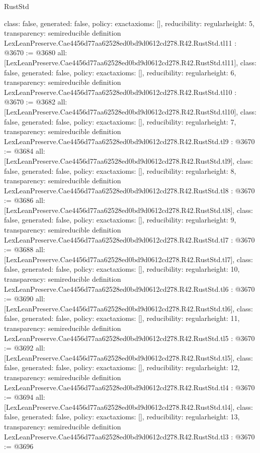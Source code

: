 \begin{lexlean}{RustStd}
\begin{coremodule}
{  class: false,
  generated: false,
  policy: exact{axioms: []},
  reducibility: regular{height: 5},
  transparency: semireducible
}
definition LexLeanPreserve.Cae4456d77aa62528ed0bd9d0612cd278.R42.RustStd.tl11 : @3670 := @3680 {
  all: [LexLeanPreserve.Cae4456d77aa62528ed0bd9d0612cd278.R42.RustStd.tl11],
  class: false,
  generated: false,
  policy: exact{axioms: []},
  reducibility: regular{height: 6},
  transparency: semireducible
}
definition LexLeanPreserve.Cae4456d77aa62528ed0bd9d0612cd278.R42.RustStd.tl10 : @3670 := @3682 {
  all: [LexLeanPreserve.Cae4456d77aa62528ed0bd9d0612cd278.R42.RustStd.tl10],
  class: false,
  generated: false,
  policy: exact{axioms: []},
  reducibility: regular{height: 7},
  transparency: semireducible
}
definition LexLeanPreserve.Cae4456d77aa62528ed0bd9d0612cd278.R42.RustStd.tl9 : @3670 := @3684 {
  all: [LexLeanPreserve.Cae4456d77aa62528ed0bd9d0612cd278.R42.RustStd.tl9],
  class: false,
  generated: false,
  policy: exact{axioms: []},
  reducibility: regular{height: 8},
  transparency: semireducible
}
definition LexLeanPreserve.Cae4456d77aa62528ed0bd9d0612cd278.R42.RustStd.tl8 : @3670 := @3686 {
  all: [LexLeanPreserve.Cae4456d77aa62528ed0bd9d0612cd278.R42.RustStd.tl8],
  class: false,
  generated: false,
  policy: exact{axioms: []},
  reducibility: regular{height: 9},
  transparency: semireducible
}
definition LexLeanPreserve.Cae4456d77aa62528ed0bd9d0612cd278.R42.RustStd.tl7 : @3670 := @3688 {
  all: [LexLeanPreserve.Cae4456d77aa62528ed0bd9d0612cd278.R42.RustStd.tl7],
  class: false,
  generated: false,
  policy: exact{axioms: []},
  reducibility: regular{height: 10},
  transparency: semireducible
}
definition LexLeanPreserve.Cae4456d77aa62528ed0bd9d0612cd278.R42.RustStd.tl6 : @3670 := @3690 {
  all: [LexLeanPreserve.Cae4456d77aa62528ed0bd9d0612cd278.R42.RustStd.tl6],
  class: false,
  generated: false,
  policy: exact{axioms: []},
  reducibility: regular{height: 11},
  transparency: semireducible
}
definition LexLeanPreserve.Cae4456d77aa62528ed0bd9d0612cd278.R42.RustStd.tl5 : @3670 := @3692 {
  all: [LexLeanPreserve.Cae4456d77aa62528ed0bd9d0612cd278.R42.RustStd.tl5],
  class: false,
  generated: false,
  policy: exact{axioms: []},
  reducibility: regular{height: 12},
  transparency: semireducible
}
definition LexLeanPreserve.Cae4456d77aa62528ed0bd9d0612cd278.R42.RustStd.tl4 : @3670 := @3694 {
  all: [LexLeanPreserve.Cae4456d77aa62528ed0bd9d0612cd278.R42.RustStd.tl4],
  class: false,
  generated: false,
  policy: exact{axioms: []},
  reducibility: regular{height: 13},
  transparency: semireducible
}
definition LexLeanPreserve.Cae4456d77aa62528ed0bd9d0612cd278.R42.RustStd.tl3 : @3670 := @3696 {
}
\end{coremodule}
\end{lexlean}
